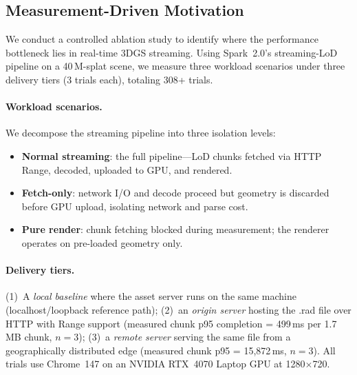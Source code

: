 \subsection{Measurement-Driven Motivation}
\label{sec:motivation}

We conduct a controlled ablation study to identify where the performance bottleneck lies in real-time 3DGS streaming.
Using Spark~2.0's streaming-LoD pipeline on a 40\,M-splat scene, we measure three workload scenarios under three delivery tiers (3 trials each), totaling 308+ trials.

\paragraph{Workload scenarios.}
We decompose the streaming pipeline into three isolation levels:
\begin{itemize}[leftmargin=*,nosep]
\item \textbf{Normal streaming}: the full pipeline---LoD chunks fetched via HTTP Range, decoded, uploaded to GPU, and rendered.
\item \textbf{Fetch-only}: network I/O and decode proceed but geometry is discarded before GPU upload, isolating network and parse cost.
\item \textbf{Pure render}: chunk fetching blocked during measurement; the renderer operates on pre-loaded geometry only.
\end{itemize}

\paragraph{Delivery tiers.}
(1)~A \emph{local baseline} where the asset server runs on the same machine (localhost/loopback reference path);
(2)~an \emph{origin server} hosting the .rad file over HTTP with Range support (measured chunk p95 completion = 499\,ms per 1.7\,MB chunk, $n{=}3$);
(3)~a \emph{remote server} serving the same file from a geographically distributed edge (measured chunk p95 = 15{,}872\,ms, $n{=}3$).
All trials use Chrome~147 on an NVIDIA RTX~4070 Laptop GPU at 1280$\times$720.

